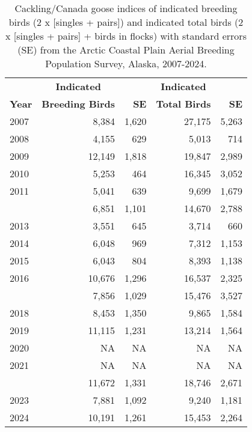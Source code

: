 \documentclass[
]{article}
\begin{document}
\begingroup\fontsize{10}{12}\selectfont

\begin{longtable}[t]{lrrrr}

\caption{\label{tbl-CCGO}Cackling/Canada goose indices of indicated
breeding birds (2 x {[}singles + pairs{]}) and indicated total birds (2
x {[}singles + pairs{]} + birds in flocks) with standard errors (SE)
from the Arctic Coastal Plain Aerial Breeding Population Survey, Alaska,
2007-2024.}

\tabularnewline

\\
\toprule
\multicolumn{1}{c}{\textbf{ }} & \multicolumn{1}{c}{\textbf{Indicated}} & \multicolumn{1}{c}{\textbf{ }} & \multicolumn{1}{c}{\textbf{Indicated}} & \multicolumn{1}{c}{\textbf{ }} \\
\cmidrule(l{3pt}r{3pt}){2-2} \cmidrule(l{3pt}r{3pt}){4-4}
\textbf{Year} & \textbf{Breeding Birds} & \textbf{SE} & \textbf{Total Birds} & \textbf{SE}\\
\midrule
2007 & 8,384 & 1,620 & 27,175 & 5,263\\
2008 & 4,155 & 629 & 5,013 & 714\\
2009 & 12,149 & 1,818 & 19,847 & 2,989\\
2010 & 5,253 & 464 & 16,345 & 3,052\\
2011 & 5,041 & 639 & 9,699 & 1,679\\
\addlinespace
2012 & 6,851 & 1,101 & 14,670 & 2,788\\
2013 & 3,551 & 645 & 3,714 & 660\\
2014 & 6,048 & 969 & 7,312 & 1,153\\
2015 & 6,043 & 804 & 8,393 & 1,138\\
2016 & 10,676 & 1,296 & 16,537 & 2,325\\
\addlinespace
2017 & 7,856 & 1,029 & 15,476 & 3,527\\
2018 & 8,453 & 1,350 & 9,865 & 1,584\\
2019 & 11,115 & 1,231 & 13,214 & 1,564\\
2020 & NA & NA & NA & NA\\
2021 & NA & NA & NA & NA\\
\addlinespace
2022 & 11,672 & 1,331 & 18,746 & 2,671\\
2023 & 7,881 & 1,092 & 9,240 & 1,181\\
2024 & 10,191 & 1,261 & 15,453 & 2,264\\
\bottomrule

\end{longtable}
\end{document}
